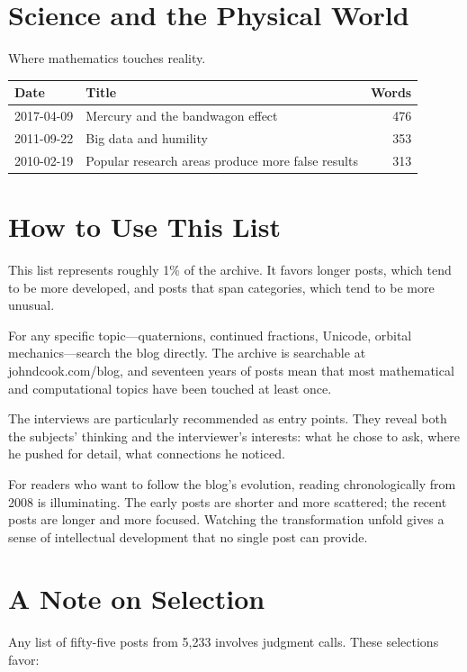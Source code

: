 \bigskip

\section*{Science and the Physical World}

Where mathematics touches reality.

\begin{longtable}{l p{5.5cm} r}
\toprule
\textbf{Date} & \textbf{Title} & \textbf{Words} \tabularnewline
\midrule
2017-04-09 & Mercury and the bandwagon effect & 476 \tabularnewline
2011-09-22 & Big data and humility & 353 \tabularnewline
2010-02-19 & Popular research areas produce more false results & 313 \tabularnewline
\bottomrule
\end{longtable}

\bigskip

\section*{How to Use This List}

This list represents roughly 1\% of the archive. It favors longer posts, which tend to be more developed, and posts that span categories, which tend to be more unusual.

For any specific topic---quaternions, continued fractions, Unicode, orbital mechanics---search the blog directly. The archive is searchable at johndcook.com/blog, and seventeen years of posts mean that most mathematical and computational topics have been touched at least once.

The interviews are particularly recommended as entry points. They reveal both the subjects' thinking and the interviewer's interests: what he chose to ask, where he pushed for detail, what connections he noticed.

For readers who want to follow the blog's evolution, reading chronologically from 2008 is illuminating. The early posts are shorter and more scattered; the recent posts are longer and more focused. Watching the transformation unfold gives a sense of intellectual development that no single post can provide.

\bigskip

\section*{A Note on Selection}

Any list of fifty-five posts from 5,233 involves judgment calls. These selections favor:

